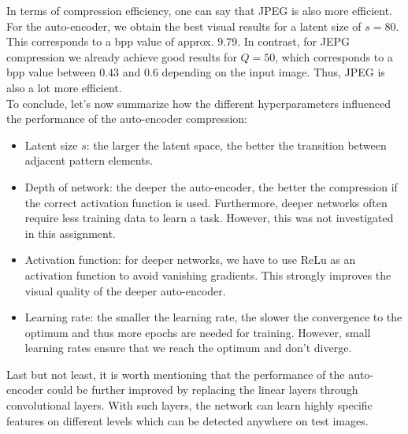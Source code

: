 \documentclass{article}
\begin{document}
In terms of compression efficiency, one can say that JPEG is also more efficient. For the auto-encoder, we obtain the best visual results for a latent size of $s=80$. This corresponds to a bpp value of approx. $9.79$. In contrast, for JEPG compression we already achieve good results for $Q=50$, which corresponds to a bpp value between $0.43$ and $0.6$ depending on the input image. Thus, JPEG is also a lot more efficient. \\

To conclude, let's now summarize how the different hyperparameters influenced the performance of the auto-encoder compression:
\begin{itemize}
    \item Latent size $s$: the larger the latent space, the better the transition between adjacent pattern elements.
    \item Depth of network: the deeper the auto-encoder, the better the compression if the correct activation function is used. Furthermore, deeper networks often require less training data to learn a task. However, this was not investigated in this assignment.
    \item Activation function: for deeper networks, we have to use ReLu as an activation function to avoid vanishing gradients. This strongly improves the visual quality of the deeper auto-encoder.
    \item Learning rate: the smaller the learning rate, the slower the convergence to the optimum and thus more epochs are needed for training. However, small learning rates ensure that we reach the optimum and don't diverge.
\end{itemize}

Last but not least, it is worth mentioning that the performance of the auto-encoder could be further improved by replacing the linear layers through convolutional layers. With such layers, the network can learn highly specific features on different levels which can be detected anywhere on test images.
\end{document}
